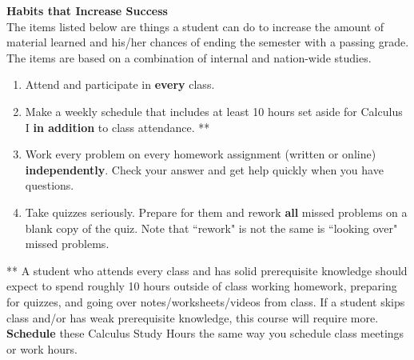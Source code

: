 \documentclass[12pt]{article}
\renewcommand{\emph}[1]{\textsf{\textbf{#1}}}
\newcommand{\localhead}[1]{\par\smallskip\textbf{#1}\nobreak\\}%
\def\heading#1{\localhead{\large\emph{#1}}}
\begin{document}
\heading{Habits that Increase Success}
The items listed below are things a student can do to increase the amount of material learned and his/her chances of ending the semester with a passing grade. The items are based on a combination of internal and nation-wide studies.
\begin{enumerate}
\item Attend and participate in {\emph{every}} class. 
\item Make a weekly schedule that includes at least 10 hours set aside for Calculus I \emph{in addition} to class attendance. **
\item Work every problem on every homework assignment (written or online) \textbf{independently}. Check your answer and get help quickly when you have questions.
\item Take quizzes seriously. Prepare for them and rework \emph{all} missed problems on a blank copy of the quiz. Note that  ``rework" is not the same is ``looking over" missed problems.   \end{enumerate}
** A student who attends every class and has solid prerequisite knowledge should expect to spend roughly 10 hours outside of class working homework, preparing for quizzes, and going over notes/worksheets/videos from class. If a student skips class and/or has weak prerequisite knowledge, this course will require more. \textbf{Schedule} these Calculus Study Hours the same way you schedule class meetings or work hours.
\end{document}

